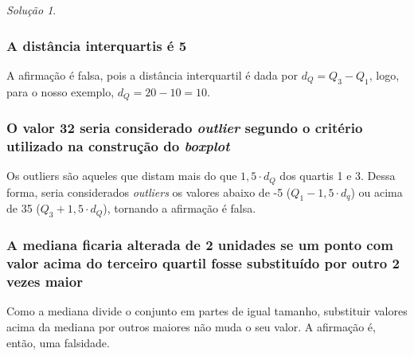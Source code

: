\documentclass[
]{latex/krantz}
\theoremstyle{definition}
\theoremstyle{definition}
\theoremstyle{definition}
\theoremstyle{definition}
\theoremstyle{remark}
\newtheorem*{solution}{Solução}
\begin{document}
\begin{solution}
\leavevmode

\hypertarget{a-distuxe2ncia-interquartis-uxe9-5}{%
\subsubsection*{A distância interquartis é 5}\label{a-distuxe2ncia-interquartis-uxe9-5}}

A afirmação é falsa, pois a distância interquartil é dada por \(d_Q = Q_3 - Q_1\), logo, para o nosso exemplo, \(d_Q = 20 - 10 = 10\).

\hypertarget{o-valor-32-seria-considerado-outlier-segundo-o-crituxe9rio-utilizado-na-construuxe7uxe3o-do-boxplot}{%
\subsubsection*{\texorpdfstring{O valor 32 seria considerado \emph{outlier} segundo o critério utilizado na construção do \emph{boxplot}}{O valor 32 seria considerado outlier segundo o critério utilizado na construção do boxplot}}\label{o-valor-32-seria-considerado-outlier-segundo-o-crituxe9rio-utilizado-na-construuxe7uxe3o-do-boxplot}}

Os outliers são aqueles que distam mais do que \(1,5 \cdot d_Q\) dos quartis 1 e 3. Dessa forma, seria considerados \emph{outliers} os valores abaixo de -5 (\(Q_1 - 1,5 \cdot d_q\)) ou acima de 35 (\(Q_3 + 1,5 \cdot d_Q\)), tornando a afirmação é falsa.

\hypertarget{a-mediana-ficaria-alterada-de-2-unidades-se-um-ponto-com-valor-acima-do-terceiro-quartil-fosse-substituuxeddo-por-outro-2-vezes-maior}{%
\subsubsection*{A mediana ficaria alterada de 2 unidades se um ponto com valor acima do terceiro quartil fosse substituído por outro 2 vezes maior}\label{a-mediana-ficaria-alterada-de-2-unidades-se-um-ponto-com-valor-acima-do-terceiro-quartil-fosse-substituuxeddo-por-outro-2-vezes-maior}}

Como a mediana divide o conjunto em partes de igual tamanho, substituir valores acima da mediana por outros maiores não muda o seu valor. A afirmação é, então, uma falsidade.


\end{solution}
\end{document}
